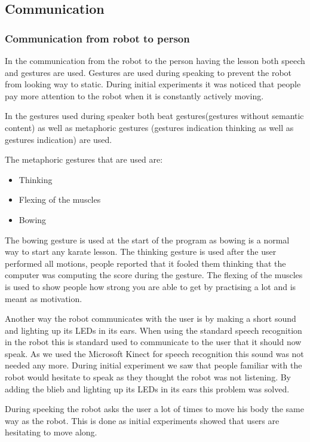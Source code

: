 \documentclass[10pt,a4paper,oneside]{scrartcl}
\begin{document}
\subsection{Communication}

\subsubsection{Communication from robot to person}
In the communication from the robot to the person having the lesson both speech and gestures are used. 
Gestures are used during speaking to prevent the robot from looking way to static. 
During initial experiments it was noticed that people pay more attention to the robot when it is constantly actively moving. 

In the gestures used during speaker both beat gestures(gestures without semantic content) as well as metaphoric gestures (gestures indication thinking as well as gestures indication) are used. 

The metaphoric gestures that are used are:
\begin{itemize}
  \item Thinking
  \item Flexing of the muscles
  \item Bowing
\end{itemize}

The bowing gesture is used at the start of the program as bowing is a normal way to start any karate lesson. 
The thinking gesture is used after the user performed all motions, people reported that it fooled them thinking that the computer was computing the score during the gesture. 
The flexing of the muscles is used to show people how strong you are able to get by practising a lot and is meant as motivation. 

Another way the robot communicates with the user is by making a short sound and lighting up its LEDs in its ears. 
When using the standard speech recognition in the robot this is standard used to communicate to the user that it should now speak. 
As we used the Microsoft Kinect for speech recognition this sound was not needed any more. 
During initial experiment we saw that people familiar with the robot would hesitate to speak as they thought the robot was not listening. 
By adding the blieb and lighting up its LEDs in its ears this problem was solved. 

During speeking the robot asks the user a lot of times to move his body the same way as the robot. 
This is done as initial experiments showed that users are hesitating to move along. 
\end{document}
